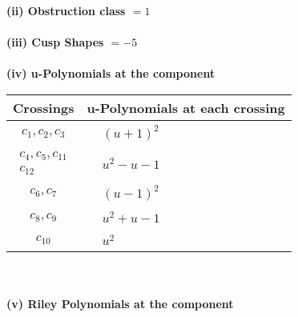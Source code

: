 \documentclass[1p]{elsarticle_modified}
\theoremstyle{definition}
\begin{document}
\flushleft \textbf{(ii) Obstruction class $= 1$}\\~\\
\flushleft \textbf{(iii) Cusp Shapes $= -5$}\\~\\
\newpage\renewcommand{\arraystretch}{1}
\flushleft \textbf{(iv) u-Polynomials at the component}\newline \\
\begin{tabular}{m{50pt}|m{274pt}}
Crossings & \hspace{64pt}u-Polynomials at each crossing \\
\hline $$\begin{aligned}c_{1},c_{2},c_{3}\end{aligned}$$&$\begin{aligned}
&(u+1)^2
\end{aligned}$\\
\hline $$\begin{aligned}c_{4},c_{5},c_{11}\\c_{12}\end{aligned}$$&$\begin{aligned}
&u^2- u-1
\end{aligned}$\\
\hline $$\begin{aligned}c_{6},c_{7}\end{aligned}$$&$\begin{aligned}
&(u-1)^2
\end{aligned}$\\
\hline $$\begin{aligned}c_{8},c_{9}\end{aligned}$$&$\begin{aligned}
&u^2+u-1
\end{aligned}$\\
\hline $$\begin{aligned}c_{10}\end{aligned}$$&$\begin{aligned}
&u^2
\end{aligned}$\\
\hline
\end{tabular}\\~\\
\newpage\renewcommand{\arraystretch}{1}
\flushleft \textbf{(v) Riley Polynomials at the component}\newline \\
\end{document}
